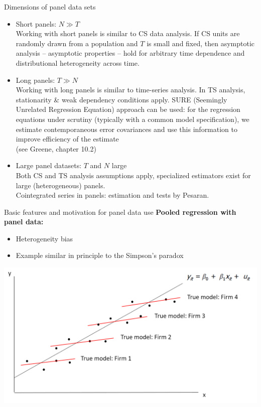 \documentclass[usenames,dvipsnames]{beamer}
\begin{document}
\begin{frame}{Dimensions of panel data sets}
\footnotesize
\begin{itemize}
\item Short panels: $N \gg T$ \\
Working with short panels is similar to CS data analysis. If CS units are randomly drawn from a population and $T$ is small and fixed, then asymptotic analysis -- asymptotic properties -- hold for arbitrary time dependence and distributional heterogeneity across time.
\medskip
\item Long panels: $T \gg N$ \\
Working with long panels is similar to time-series analysis. In TS analysis, stationarity \& weak dependency conditions apply. SURE (Seemingly Unrelated Regression Equation) approach can be used: for the regression equations under scrutiny (typically with a common model specification), we estimate contemporaneous error covariances and use this information to improve efficiency of the estimate \\(see Greene, chapter 10.2)
\medskip
\item Large panel datasets: $T$ and $N$ large\\
Both CS and TS analysis assumptions apply, specialized estimators exist for large (heterogeneous) panels.\\Cointegrated series in panels: estimation and tests by Pesaran.
\end{itemize}
\end{frame}
\begin{frame}{Basic features and motivation for panel data use}
\textbf{Pooled regression with panel data:} \\ \medskip
\begin{itemize}
    \item Heterogeneity bias
    \medskip
    \item Example similar in principle to the Simpson's paradox
\end{itemize}
\medskip
\includegraphics[width=\textwidth]{./img/Obrazek4}
\end{frame}
\end{document}
